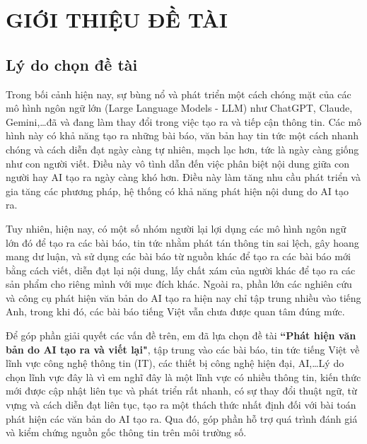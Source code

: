 
\chapter{GIỚI THIỆU ĐỀ TÀI}

\section{Lý do chọn đề tài}
Trong bối cảnh hiện nay, sự bùng nổ và phát triển một cách chóng mặt của các mô hình ngôn ngữ lớn (Large Language Models - LLM) như ChatGPT, Claude, Gemini,\dots đã và đang làm thay đổi trong việc tạo ra và tiếp cận thông tin. Các mô hình này
có khả năng tạo ra những bài báo, văn bản hay tin tức một cách nhanh chóng và cách diễn đạt ngày càng tự nhiên, mạch lạc hơn, tức là ngày càng giống như con người viết. Điều này vô tình dẫn đến việc phân biệt nội dung giữa con người hay AI tạo ra
ngày càng khó hơn. Điều này làm tăng nhu cầu phát triển và gia tăng các phương pháp, hệ thống có khả năng phát hiện nội dung do AI tạo ra.

\vspace{\baselineskip}
\noindent Tuy nhiên, hiện nay, có một số nhóm người lại lợi dụng các mô hình ngôn ngữ lớn đó để tạo ra các bài báo, tin tức nhằm phát tán thông tin sai lệch, gây hoang mang dư luận, và sử dụng các bài báo từ nguồn khác để tạo ra các bài báo mới bằng 
cách viết, diễn đạt lại nội dung, lấy chất xám của người khác để tạo ra các sản phẩm cho riêng mình với mục đích khác. Ngoài ra, phần lớn các nghiên cứu và công cụ phát hiện văn bản do AI tạo ra hiện nay chỉ tập trung nhiều vào tiếng Anh, trong khi đó, các 
bài báo tiếng Việt vẫn chưa được quan tâm đúng mức.  

\vspace{\baselineskip}
\noindent Để góp phần giải quyết các vấn đề trên, em đã lựa chọn đề tài \textbf{“Phát hiện văn bản do AI tạo ra và viết lại"}, tập trung vào các bài báo, tin tức tiếng Việt về lĩnh vực công nghệ thông tin (IT), các thiết bị công nghệ hiện đại, AI,\dots Lý do chọn lĩnh vực đây là vì
em nghĩ đây là một lĩnh vực có nhiều thông tin, kiến thức mới được cập nhật liên tục và phát triển rất nhanh, có sự thay đổi thuật ngữ, từ vựng và cách diễn đạt liên tục, tạo ra một thách thức nhất định đối với bài toán phát hiện các văn bản do AI tạo ra. Qua đó, góp phần hỗ trợ quá
trình đánh giá và kiểm chứng nguồn gốc thông tin trên môi trường số. 

